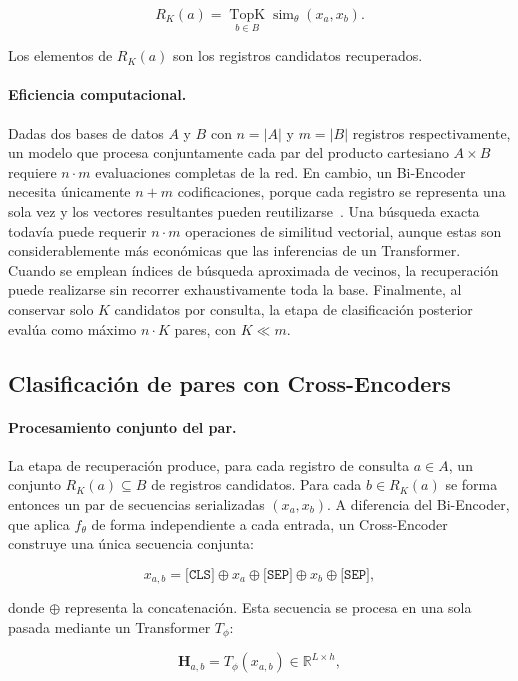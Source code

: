\[
R_K(a)=
\underset{b\in B}{\operatorname{TopK}}
\operatorname{sim}_\theta(x_a,x_b).
\]

Los elementos de $R_K(a)$ son los registros candidatos recuperados.

\paragraph{Eficiencia computacional.}
Dadas dos bases de datos $A$ y $B$ con $n=|A|$ y $m=|B|$ registros respectivamente, un modelo que procesa conjuntamente cada par del producto cartesiano $A\times B$ requiere $n\cdot m$ evaluaciones completas de la red. En cambio, un Bi-Encoder necesita únicamente $n+m$ codificaciones, porque cada registro se representa una sola vez y los vectores resultantes pueden reutilizarse~\cite{reimers2019}. Una búsqueda exacta todavía puede requerir $n\cdot m$ operaciones de similitud vectorial, aunque estas son considerablemente más económicas que las inferencias de un Transformer. Cuando se emplean índices de búsqueda aproximada de vecinos, la recuperación puede realizarse sin recorrer exhaustivamente toda la base. Finalmente, al conservar solo $K$ candidatos por consulta, la etapa de clasificación posterior evalúa como máximo $n\cdot K$ pares, con $K\ll m$.

\subsection{Clasificación de pares con Cross-Encoders}

\paragraph{Procesamiento conjunto del par.}
La etapa de recuperación produce, para cada registro de consulta $a\in A$, un conjunto $R_K(a)\subseteq B$ de registros candidatos. Para cada $b\in R_K(a)$ se forma entonces un par de secuencias serializadas $(x_a,x_b)$. A diferencia del Bi-Encoder, que aplica $f_\theta$ de forma independiente a cada entrada, un Cross-Encoder~\cite{humeau2020} construye una única secuencia conjunta:

\[
x_{a,b}
=
\texttt{[CLS]}
\oplus x_a
\oplus \texttt{[SEP]}
\oplus x_b
\oplus \texttt{[SEP]},
\]

donde $\oplus$ representa la concatenación. Esta secuencia se procesa en una sola pasada mediante un Transformer $T_\phi$:

\[
\mathbf H_{a,b}
=
T_\phi(x_{a,b})
\in\mathbb R^{L\times h},
\]

